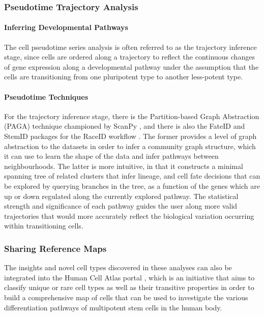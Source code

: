 \documentclass[a4paper,num-refs]{oup-contemporary}
\begin{document}
\subsubsection{Pseudotime Trajectory Analysis}

\paragraph{Inferring Developmental Pathways}
The cell pseudotime series analysis is often referred to as the trajectory inference stage, since cells are ordered along a trajectory to reflect the continuous changes of gene expression along a developmental pathway under the assumption that the cells are transitioning from one pluripotent type to another less-potent type.

\paragraph{Pseudotime Techniques}
For the trajectory inference stage, there is the Partition-based Graph Abstraction (PAGA) technique championed by ScanPy \citep{wolf2019paga}, and there is also the FateID and StemID packages for the RaceID workflow \citep{herman2018fateid}. The former provides a level of graph abstraction to the datasets in order to infer a community graph structure, which it can use to learn the shape of the data and infer pathways between neighbourhoods. The latter is more intuitive, in that it constructs a minimal spanning tree of related clusters that infer lineage, and cell fate decisions that can be explored by querying branches in the tree, as a function of the genes which are up or down regulated along the currently explored pathway. The statistical strength and significance of each pathway guides the user along more valid trajectories that would more accurately reflect the biological variation occurring within transitioning cells.

\subsubsection{Sharing Reference Maps}

The insights and novel cell types discovered in these analyses can also be integrated into the Human Cell Atlas portal \citep{regev2017science}, which is an initiative that aims to classify unique or rare cell types as well as their transitive properties in order to build a comprehensive map of cells that can be used to investigate the various differentiation pathways of multipotent stem cells in the human body.
\end{document}
